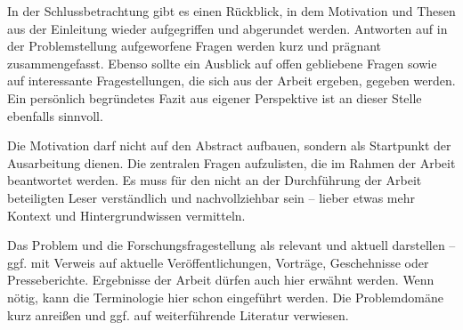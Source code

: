 In der Schlussbetrachtung gibt es einen Rückblick, in dem Motivation und Thesen aus der Einleitung wieder aufgegriffen und abgerundet werden. Antworten auf in der Problemstellung aufgeworfene Fragen werden kurz und prägnant zusammengefasst. Ebenso sollte ein Ausblick auf offen gebliebene Fragen sowie auf interessante Fragestellungen, die sich aus der Arbeit ergeben, gegeben werden. Ein persönlich begründetes Fazit aus eigener Perspektive ist an dieser Stelle ebenfalls sinnvoll.

Die Motivation darf nicht auf den Abstract aufbauen, sondern als Startpunkt der Ausarbeitung dienen.
Die zentralen Fragen aufzulisten, die im Rahmen der Arbeit beantwortet werden.
Es muss für den nicht an der Durchführung der Arbeit beteiligten Leser verständlich und nachvollziehbar sein – lieber etwas mehr Kontext und Hintergrundwissen vermitteln.

Das Problem und die Forschungsfragestellung als relevant und aktuell darstellen – ggf. mit Verweis auf aktuelle Veröffentlichungen, Vorträge, Geschehnisse oder Presseberichte.
Ergebnisse der Arbeit dürfen auch hier erwähnt werden.
Wenn nötig, kann die Terminologie hier schon eingeführt werden.
Die Problemdomäne kurz anreißen und ggf. auf weiterführende Literatur verwiesen.
